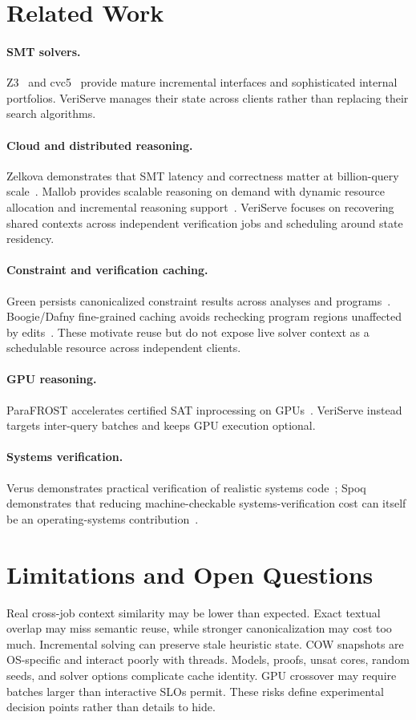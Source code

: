 \documentclass[10pt,twocolumn]{article}
\begin{document}
\section{Related Work}
\paragraph{SMT solvers.} Z3~\cite{demoura2008z3} and cvc5~\cite{barbosa2022cvc5} provide mature incremental interfaces and sophisticated internal portfolios. VeriServe manages their state across clients rather than replacing their search algorithms.
\paragraph{Cloud and distributed reasoning.} Zelkova demonstrates that SMT latency and correctness matter at billion-query scale~\cite{rungta2022billion}. Mallob provides scalable reasoning on demand with dynamic resource allocation and incremental reasoning support~\cite{schreiber2026mallob}. VeriServe focuses on recovering shared contexts across independent verification jobs and scheduling around state residency.
\paragraph{Constraint and verification caching.} Green persists canonicalized constraint results across analyses and programs~\cite{visser2012green}. Boogie/Dafny fine-grained caching avoids rechecking program regions unaffected by edits~\cite{leino2015caching}. These motivate reuse but do not expose live solver context as a schedulable resource across independent clients.
\paragraph{GPU reasoning.} ParaFROST accelerates certified SAT inprocessing on GPUs~\cite{osama2024parafrost}. VeriServe instead targets inter-query batches and keeps GPU execution optional.
\paragraph{Systems verification.} Verus demonstrates practical verification of realistic systems code~\cite{lattuada2024verus}; Spoq demonstrates that reducing machine-checkable systems-verification cost can itself be an operating-systems contribution~\cite{li2023spoq}.

\section{Limitations and Open Questions}
Real cross-job context similarity may be lower than expected. Exact textual overlap may miss semantic reuse, while stronger canonicalization may cost too much. Incremental solving can preserve stale heuristic state. COW snapshots are OS-specific and interact poorly with threads. Models, proofs, unsat cores, random seeds, and solver options complicate cache identity. GPU crossover may require batches larger than interactive SLOs permit. These risks define experimental decision points rather than details to hide.
\end{document}
